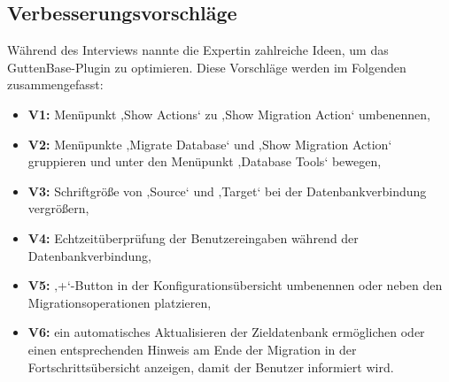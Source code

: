 \subsection*{\textbf{Verbesserungsvorschläge}}
\label{sec:verbesserung}
Während des Interviews nannte die Expertin zahlreiche Ideen, um das GuttenBase-Plugin zu optimieren. Diese Vorschläge werden im Folgenden zusammengefasst:
\begin{itemize}
	\item \textbf{V1:} Menüpunkt ‚Show Actions‘ zu ‚Show Migration Action‘ umbenennen,
	\item \textbf{V2:} Menüpunkte ‚Migrate Database‘ und ‚Show Migration Action‘ gruppieren und unter den Menüpunkt ‚Database Tools‘ bewegen,
	\item \textbf{V3:} Schriftgröße von ‚Source‘ und ‚Target‘ bei der Datenbankverbindung vergrößern,
	\item \textbf{V4:} Echtzeitüberprüfung der Benutzereingaben während der Datenbankverbindung,
	\item \textbf{V5:} ‚+‘-Button in der Konfigurationsübersicht umbenennen oder neben den Migrationsoperationen platzieren,
	\item \textbf{V6:} ein automatisches Aktualisieren der Zieldatenbank ermöglichen oder einen entsprechenden Hinweis am Ende der Migration in der Fortschrittsübersicht anzeigen, damit der Benutzer informiert wird.
\end{itemize}


%	
%		

